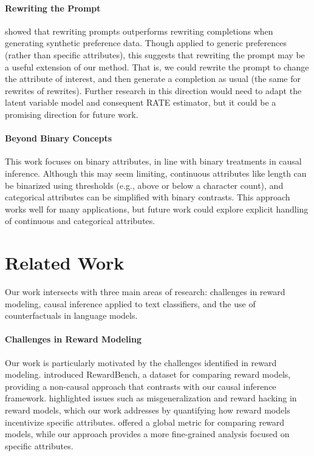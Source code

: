 \documentclass{article}
\begin{document}
\paragraph{Rewriting the Prompt} \citet{wang2024selftaughtevaluators} showed that rewriting prompts outperforms rewriting completions when generating synthetic preference data. Though applied to generic preferences (rather than specific attributes), this suggests that rewriting the prompt may be a useful extension of our method. That is, we could rewrite the prompt to change the attribute of interest, and then generate a completion as usual (the same for rewrites of rewrites). Further research in this direction would need to adapt the latent variable model and consequent RATE estimator, but it could be a promising direction for future work.

\paragraph{Beyond Binary Concepts}
This work focuses on binary attributes, in line with binary treatments in causal inference. Although this may seem limiting, continuous attributes like length can be binarized using thresholds (e.g., above or below a character count), and categorical attributes can be simplified with binary contrasts. This approach works well for many applications, but future work could explore explicit handling of continuous and categorical attributes.

  
\section{Related Work}
\label{sec:related_work}
Our work intersects with three main areas of research: challenges in reward modeling, causal inference applied to text classifiers, and the use of counterfactuals in language models.

\paragraph{Challenges in Reward Modeling} Our work is particularly motivated by the challenges identified in reward modeling. \citet{lambert2024rewardbenchevaluatingrewardmodels} introduced RewardBench, a dataset for comparing reward models, providing a non-causal approach that contrasts with our causal inference framework. \citet{casper2023openproblemsfundamentallimitations} highlighted issues such as misgeneralization and reward hacking in reward models, which our work addresses by quantifying how reward models incentivize specific attributes. \citet{gleave2021quantifyingdifferencesrewardfunctions} offered a global metric for comparing reward models, while our approach provides a more fine-grained analysis focused on specific attributes.
\end{document}
